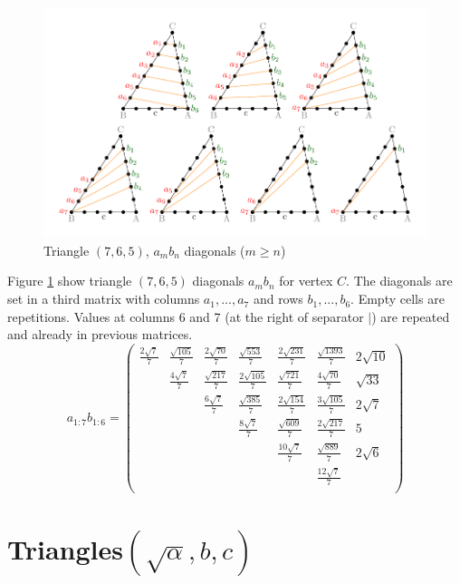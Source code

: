 \documentclass[11pt]{article}
\begin{document}
\begin{figure}[htp]
\centering
\includegraphics[scale=1]{t765ab}
\caption{Triangle $(7,6,5)$, $a_mb_n$ diagonals ($m \ge n$)}
\label{t765ab}
\end{figure}
Figure \ref{t765ab} show triangle $(7,6,5)$ diagonals $a_mb_n$ for vertex $C$.
The diagonals are set in a third matrix with columns $a_1,...,a_7$ and rows $b_1,...,b_6$. Empty cells are repetitions.
Values at columns 6 and 7 (at the right of separator $|$) are repeated and already in previous matrices.
\begin{equation}\label{eq:appendrow}
a_{1:7}b_{1:6} = \left(\begin{array}{ccccccc}
\frac{2\sqrt{7}}{7} & \frac{\sqrt{105}}{7} & \frac{2\sqrt{70}}{7} & \frac{\sqrt{553}}{7} & \frac{2\sqrt{231}}{7} & \frac{\sqrt{1393}}{7} & 2\sqrt{10} \\
& \frac{4\sqrt{7}}{7} & \frac{\sqrt{217}}{7} & \frac{2\sqrt{105}}{7} & \frac{\sqrt{721}}{7} & \frac{4\sqrt{70}}{7} & \sqrt{33} \\
& & \frac{6\sqrt{7}}{7} & \frac{\sqrt{385}}{7} & \frac{2\sqrt{154}}{7} & \frac{3\sqrt{105}}{7} & 2\sqrt{7} \\
& & & \frac{8\sqrt{7}}{7} & \frac{\sqrt{609}}{7} & \frac{2\sqrt{217}}{7} & 5 \\
& & & & \frac{10\sqrt{7}}{7} & \frac{\sqrt{889}}{7} & 2\sqrt{6} \\
& & & & & \frac{12\sqrt{7}}{7} & \\
\end{array}\right)
\end{equation}

\section{Triangles$(\sqrt{\alpha},b,c)$}
\end{document}
